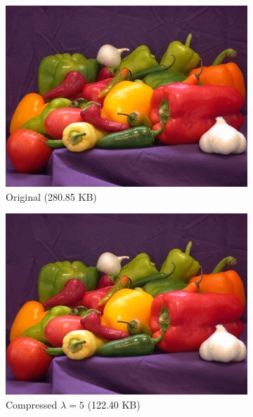 \documentclass{article}
\theoremstyle{definition}
\begin{document}
  \clearpage

  \begin{figure}
    \centering
    \begin{subfigure}[t]{.49\linewidth}
      \centering
      \includegraphics[trim={0 0 3.7in 2.8in},clip]{figs/peppers.png}
      \caption{Original (280.85 KB)}
    \end{subfigure}
    \begin{subfigure}[t]{.49\linewidth}
      \centering
      \includegraphics[trim={0 0 3.7in 2.8in},clip]{figs/peppers_haar_5.png}
      \caption{Compressed \(\lambda = 5\) (122.40 KB)}
    \end{subfigure}
    \begin{subfigure}[t]{.49\linewidth}

\end{subfigure}
\end{figure}
\end{document}
